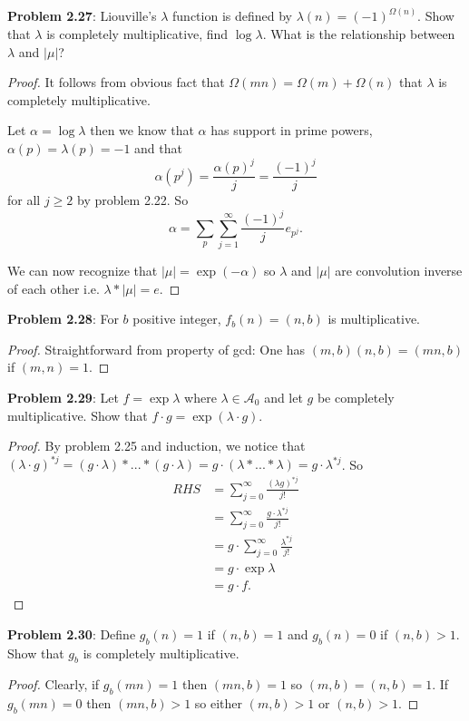 \documentclass{article}
\newcommand{\A}{\mathcal{A}}
\begin{document}
\textbf{Problem 2.27}: Liouville's $\lambda$ function is defined by $\lambda(n) = (-1)^{\Omega(n)}$. Show that $\lambda$ is completely multiplicative, find $\log \lambda$. What is the relationship between $\lambda$ and $|\mu|$?

\begin{proof}
It follows from obvious fact that $\Omega(mn) = \Omega(m) + \Omega(n)$ that $\lambda$ is completely multiplicative.

Let $\alpha = \log \lambda$ then we know that $\alpha$ has support in prime powers, $\alpha(p) = \lambda(p) = -1$ and that
$$\alpha(p^j) = \frac{\alpha(p)^j}{j} = \frac{(-1)^j}{j}$$
for all $j \geq 2$ by problem 2.22. So
$$\alpha = \sum_p \sum_{j = 1}^{\infty} \frac{(-1)^j}{j} e_{p^j}.$$

We can now recognize that $|\mu| = \exp(-\alpha)$ so $\lambda$ and $|\mu|$ are convolution inverse of each other i.e. $\lambda * |\mu| = e$.
\end{proof}

\textbf{Problem 2.28}: For $b$ positive integer, $f_b(n) = (n, b)$ is multiplicative.

\begin{proof}
Straightforward from property of gcd: One has $(m, b) (n, b) = (mn, b)$ if $(m, n) = 1$.
\end{proof}

\textbf{Problem 2.29}: Let $f = \exp \lambda$ where $\lambda \in \A_0$ and let $g$ be completely multiplicative. Show that $f \cdot g = \exp(\lambda \cdot g)$.

\begin{proof}
By problem 2.25 and induction, we notice that $(\lambda \cdot g)^{*j} = (g \cdot \lambda) * ... * (g \cdot \lambda) = g \cdot (\lambda * ... * \lambda) = g \cdot \lambda^{*j}$. So
\begin{align*}
RHS &= \sum_{j=0}^{\infty} \frac{(\lambda g)^{*j}}{j!}\\
&= \sum_{j=0}^{\infty} \frac{g \cdot \lambda^{*j}}{j!}\\
&= g \cdot \sum_{j=0}^{\infty} \frac{\lambda^{*j}}{j!}\\
&= g \cdot \exp \lambda\\
&= g \cdot f.
\end{align*}
\end{proof}

\textbf{Problem 2.30}: Define $g_b(n) = 1$ if $(n, b) = 1$ and $g_b(n) = 0$ if $(n, b) > 1$. Show that $g_b$ is completely multiplicative.

\begin{proof}
Clearly, if $g_b(mn) = 1$ then $(mn, b) = 1$ so $(m, b) = (n, b) = 1$. If $g_b(mn) = 0$ then $(mn, b) > 1$ so either $(m, b) > 1$ or $(n, b) > 1$.
\end{proof}
\end{document}

